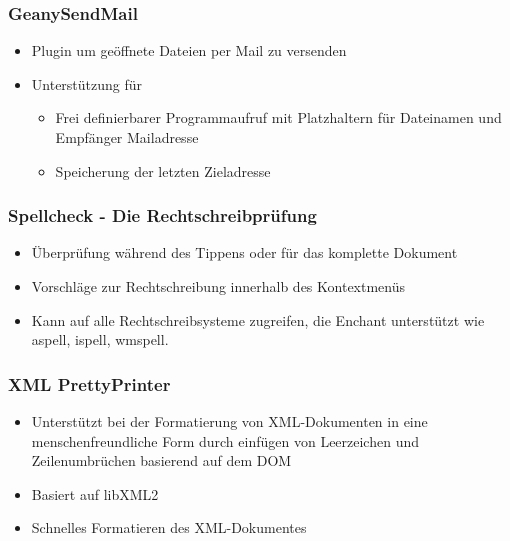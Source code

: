 \begin{frame}
  \frametitle{GeanySendMail}
  \begin{block}{}
    \begin{itemize}
      \item Plugin um geöffnete Dateien per Mail zu versenden
      \item Unterstützung für
        \begin{itemize}
        \item Frei definierbarer Programmaufruf mit Platzhaltern für
          Dateinamen und Empfänger Mailadresse
        \item Speicherung der letzten Zieladresse
        \end{itemize}
    \end{itemize}
  \end{block}
\end{frame}

\begin{frame}
  \frametitle{Spellcheck - Die Rechtschreibprüfung}
  \begin{block}{}
    \begin{itemize}
    \item Überprüfung während des Tippens oder für das komplette
      Dokument
    \item Vorschläge zur Rechtschreibung innerhalb des Kontextmenüs
    \item Kann auf alle Rechtschreibsysteme zugreifen, die Enchant
      unterstützt wie aspell, ispell, wmspell.
    \end{itemize}
  \end{block}
\end{frame}

\begin{frame}
    \frametitle{XML PrettyPrinter}
    \begin{block}{}
    \begin{itemize}
        \item Unterstützt bei der Formatierung von XML-Dokumenten
              in eine menschenfreundliche Form durch einfügen von
              Leerzeichen und Zeilenumbrüchen basierend auf dem DOM
        \item Basiert auf libXML2
        \item Schnelles Formatieren des XML-Dokumentes
    \end{itemize}
    \end{block}
\end{frame}

